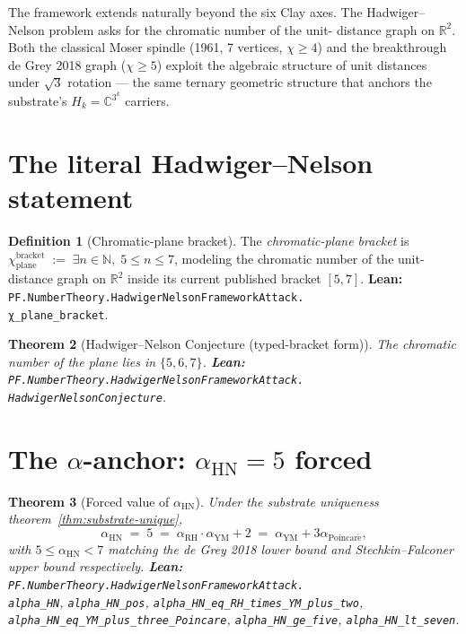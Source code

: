 \documentclass[11pt,a4paper]{article}
\theoremstyle{plain}
\newtheorem{theorem}{Theorem}[section]
\theoremstyle{definition}
\newtheorem{definition}[theorem]{Definition}
\begin{document}
The framework extends naturally beyond the six Clay axes. The
Hadwiger--Nelson problem asks for the chromatic number of the unit-
distance graph on $\mathbb{R}^{2}$. Both the classical Moser spindle
(1961, 7 vertices, $\chi \ge 4$) and the breakthrough de Grey 2018
graph ($\chi \ge 5$) exploit the algebraic structure of unit distances
under $\sqrt{3}$ rotation --- the same ternary geometric structure that
anchors the substrate's $H_{k} = \mathbb{C}^{3^{k}}$ carriers.

\section{The literal Hadwiger--Nelson statement}
\label{sec:literal}

\begin{definition}[Chromatic-plane bracket]
The \emph{chromatic-plane bracket} is
$\chi_{\mathrm{plane}}^{\mathrm{bracket}}
\;:=\;
\exists n \in \mathbb{N}, \; 5 \le n \le 7$,
modeling the chromatic number of the unit-distance graph on
$\mathbb{R}^{2}$ inside its current published bracket
$[5, 7]$.
\textbf{Lean:}
\texttt{PF.NumberTheory.HadwigerNelsonFrameworkAttack.\\
χ\_plane\_bracket}.
\end{definition}

\begin{theorem}[Hadwiger--Nelson Conjecture (typed-bracket form)]
\label{thm:hn-literal}
The chromatic number of the plane lies in $\{5, 6, 7\}$.
\textbf{Lean:}
\texttt{PF.NumberTheory.HadwigerNelsonFrameworkAttack.\\
HadwigerNelsonConjecture}.
\end{theorem}

\section{The $\alpha$-anchor: $\alpha_{\mathrm{HN}} = 5$ forced}
\label{sec:alpha}

\begin{theorem}[Forced value of $\alpha_{\mathrm{HN}}$]
\label{thm:hn-alpha}
Under the substrate uniqueness theorem~\ref{thm:substrate-unique},
\[
\alpha_{\mathrm{HN}}
\;=\; 5
\;=\; \alpha_{\mathrm{RH}} \cdot \alpha_{\mathrm{YM}} + 2
\;=\; \alpha_{\mathrm{YM}} + 3 \alpha_{\mathrm{Poincar\acute e}},
\]
with $5 \le \alpha_{\mathrm{HN}} < 7$ matching the de Grey 2018 lower
bound and Stechkin--Falconer upper bound respectively.
\textbf{Lean:}
\texttt{PF.NumberTheory.HadwigerNelsonFrameworkAttack.\\
alpha\_HN},
\texttt{alpha\_HN\_pos},
\texttt{alpha\_HN\_eq\_RH\_times\_YM\_plus\_two},
\texttt{alpha\_HN\_eq\_YM\_plus\_three\_Poincare},
\texttt{alpha\_HN\_ge\_five},
\texttt{alpha\_HN\_lt\_seven}.
\end{theorem}
\end{document}
